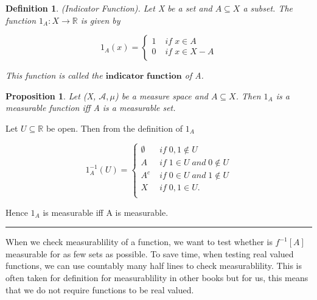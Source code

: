 \documentclass[twoside]{article}
\newtheorem{proposition}[theorem]{Proposition}
\newtheorem{definition}[theorem]{Definition}
\newenvironment{proof}{{\bf Proof:}}{\hfill\rule{2mm}{2mm}}
\begin{document}
\begin{definition}
(Indicator Function). Let X be a set and $A \subseteq X$ a subset. The function $1_A: X \rightarrow \mathbb{R}$ is given by

\[ 1_A(x) = \begin{cases} 
                1 & \; if \; x \in A \\
                0 & \; if \; x \in X - A \\
            \end{cases}
         \]

This function is called the $\textbf{indicator function}$ of A.
\end{definition}

\begin{proposition}
Let (X, $\mathcal{A}, \mu$) be a measure space and $A \subseteq X$. Then $1_A$ is a measurable function iff A is a measurable set.
\end{proposition}

\begin{proof}
Let $U \subseteq \mathbb{R}$ be open. Then from the definition of $1_A$

\[1_A^{-1}(U) =  \begin{cases} 
                \emptyset & \; if \; 0,1 \not\in U \\
                A & \; if \; 1 \in U \; and \; 0 \not\in U \\
                A^c & \; if \; 0 \in U \; and \; 1 \not\in U \\
                X & \; if \; 0, 1 \in U.\\
            \end{cases}
         \]

Hence $1_A$ is measurable iff A is measurable.
\end{proof}

When we check measurablility of a function, we want to test whether is $f^{-1}[A]$ measurable for as few sets as possible. To save time, when testing real valued functions, we can use countably many half lines to check measurablility. This is often taken for definition for measurablility in other books but for us, this means that we do not require functions to be real valued.
\end{document}
